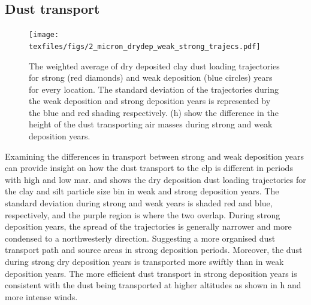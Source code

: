 \subsection{Dust transport}
\begin{figure}[htbp]
    \centering
    \texttt{[image: texfiles/figs/2\_micron\_drydep\_weak\_strong\_trajecs.pdf]}
    \caption{The weighted average of dry deposited clay dust loading trajectories for strong (red diamonds) and weak deposition (blue circles) years for every location. The standard deviation of the trajectories during the weak deposition and strong deposition years is represented by the blue and red shading respectively.  (h) show the difference in the height of the dust transporting air masses during strong and weak deposition years. }
    \label{fig:strong_weak_drydepo_year_2mmu_trajecs}
\end{figure}

Examining the differences in transport between strong and weak deposition years can provide insight on how the dust transport to the \acrshort{clp} is different in periods with high and low \acrshort{mar}. 
 and  shows the dry deposition dust loading trajectories for the clay and silt particle size bin in weak and strong deposition years. 
The standard deviation during strong and weak years is shaded red and blue, respectively, and the purple region is where the two overlap. 
During strong deposition years, the spread of the trajectories is generally narrower and more condensed to a northwesterly direction.
Suggesting a more organised dust transport path and source areas in strong deposition periods.   
Moreover, the dust during strong dry deposition years is transported more swiftly than in weak deposition years. 
The more efficient dust transport in strong deposition years is consistent with the dust being transported at higher altitudes as shown in h and more intense winds.


